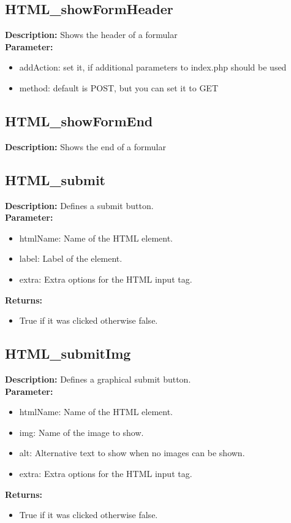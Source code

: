 \subsection{HTML\_showFormHeader}
\textbf{Description:} Shows the header of a formular\\
\textbf{Parameter:}
\begin{itemize}
\item addAction: set it, if additional parameters to index.php should be used
\item method: default is POST, but you can set it to GET
\end{itemize}

\subsection{HTML\_showFormEnd}
\textbf{Description:} Shows the end of a formular\\

\subsection{HTML\_submit}
\textbf{Description:} Defines a submit button.\\
\textbf{Parameter:}
\begin{itemize}
\item htmlName: Name of the HTML element.
\item label: Label of the element.
\item extra: Extra options for the HTML input tag.
\end{itemize}
\textbf{Returns:}
\begin{itemize}
\item True if it was clicked otherwise false.
\end{itemize}

\subsection{HTML\_submitImg}
\textbf{Description:} Defines a graphical submit button.\\
\textbf{Parameter:}
\begin{itemize}
\item htmlName: Name of the HTML element.
\item img: Name of the image to show.
\item alt: Alternative text to show when no images can be shown.
\item extra: Extra options for the HTML input tag.
\end{itemize}
\textbf{Returns:}
\begin{itemize}
\item True if it was clicked otherwise false.
\end{itemize}

